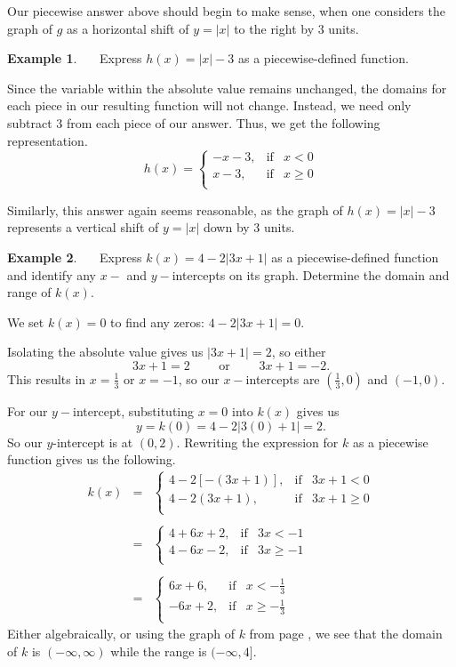 \documentclass[12pt]{book}
\theoremstyle{definition}
\newtheorem{example}{Example}
\begin{document}
Our piecewise answer above should begin to make sense, when one considers the graph of $g$ as a horizontal shift of $y=|x|$ to the right by 3 units.\par
\begin{example}~~~Express $h(x) = |x|-3$ as a piecewise-defined function.\par
Since the variable within the absolute value remains unchanged, the domains for each piece in our resulting function will not change.  Instead, we need only subtract $3$ from each piece of our answer.  Thus, we get the following representation.
\[ h(x) =\left\{ \begin{array}{rcl} -x-3, & \mbox{if} & x<0  \\ x-3, & \mbox{if} & x \geq 0 \\ \end{array} \right.\]
\end{example}
Similarly, this answer again seems reasonable, as the graph of $h(x)=|x|-3$ represents a vertical shift of $y=|x|$ down by 3 units.\par
\begin{example}~~~Express $k(x)= 4 - 2|3x+1|$ as a piecewise-defined function and identify any $x-$ and $y-$intercepts on its graph.  Determine the domain and range of $k(x)$.\par
We set $k(x)=0$ to find any zeros: $4 - 2|3x+1|=0$.\par
Isolating the absolute value gives us $|3x+1|=2$, so either  $$3x+1 = 2\qquad\text{~or~}\qquad 3x+1=-2.$$
This results in $x=\frac{1}{3}$ or $x=-1$, so our $x-$intercepts are $\left(\frac{1}{3},0\right)$ and $(-1,0)$.\par
For our $y-$intercept, substituting $x=0$ into $k(x)$ gives us $$y = k(0) = 4-2|3(0)+1| = 2.$$
So our $y$-intercept is at $(0,2)$.  Rewriting the expression for $k$ as a piecewise function gives us the following.
\begin{eqnarray*}
k(x) & = & \left\{ \begin{array}{rcl} 4-2[-(3x+1)], & \mbox{if} & 3x+1 <0  \\ 4-2(3x+1), & \mbox{if} & 3x+1 \geq 0 \\ \end{array} \right.\\
&&\\
&=& \left\{ \begin{array}{rcl} 4+6x+2, & \mbox{if} & 3x < -1 \\[2pt]  4-6x-2, & \mbox{if} & 3x \geq -1 \\ \end{array} \right.\\
&&\\
&=&\left\{ \begin{array}{rcl} 6x+6, & \mbox{if} & x < -\frac{1}{3} \\[2pt]  -6x+2, & \mbox{if} & x \geq - \frac{1}{3} \\ \end{array} \right.
\end{eqnarray*}
Either algebraically, or using the graph of $k$ from page \pageref{absvalgraph}, we see that the domain of $k$ is $(-\infty, \infty)$ while the range is $(-\infty, 4]$.
\end{example}
\end{document}
